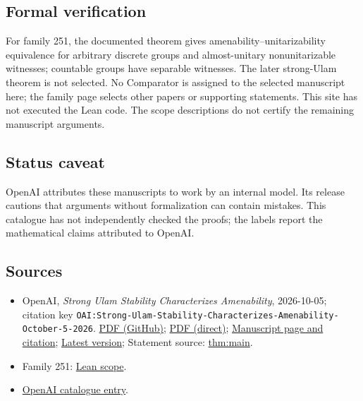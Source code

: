 \documentclass[11pt]{article}
\begin{document}
\subsection{Formal verification}
For family 251, the documented theorem gives amenability--unitarizability equivalence for arbitrary discrete groups and almost-unitary nonunitarizable witnesses; countable groups have separable witnesses. The later strong-Ulam theorem is not selected. No Comparator is assigned to the selected manuscript here; the family page selects other papers or supporting statements. This site has not executed the Lean code. The scope descriptions do not certify the remaining manuscript arguments.

\subsection{Status caveat}
OpenAI attributes these manuscripts to work by an internal model. Its release cautions that arguments without formalization can contain mistakes. This catalogue has not independently checked the proofs; the labels report the mathematical claims attributed to OpenAI.

\subsection{Sources}
\begin{itemize}
\item OpenAI, \emph{Strong Ulam Stability Characterizes Amenability}, 2026-10-05; citation key \texttt{OAI:Strong-Ulam-Stability-Characterizes-Amenability-October-5-2026}. \href{https://github.com/openai/math/blob/adc7f1241b42e322a6451854ab7e4b4c146bf78a/preprints/Strong-Ulam-Stability-Characterizes-Amenability-October-5-2026/strong-ulam-stability.pdf}{PDF (GitHub)}; \href{https://github.com/openai/math/raw/adc7f1241b42e322a6451854ab7e4b4c146bf78a/preprints/Strong-Ulam-Stability-Characterizes-Amenability-October-5-2026/strong-ulam-stability.pdf}{PDF (direct)}; \href{https://github.com/openai/math/blob/adc7f1241b42e322a6451854ab7e4b4c146bf78a/preprints/Strong-Ulam-Stability-Characterizes-Amenability-October-5-2026/README.md}{Manuscript page and citation}; \href{https://github.com/openai/math/blob/main/preprints/Strong-Ulam-Stability-Characterizes-Amenability-October-5-2026/strong-ulam-stability.pdf}{Latest version}; Statement source: \href{https://github.com/openai/math/blob/adc7f1241b42e322a6451854ab7e4b4c146bf78a/preprints/Strong-Ulam-Stability-Characterizes-Amenability-October-5-2026/build/strong-ulam-stability.tex\#L67}{thm:main}.
\item Family 251: \href{https://github.com/openai/math/blob/adc7f1241b42e322a6451854ab7e4b4c146bf78a/lean/docs/251.md}{Lean scope}.
\item \href{https://github.com/openai/math/blob/adc7f1241b42e322a6451854ab7e4b4c146bf78a/CONTENTS.md}{OpenAI catalogue entry}.
\end{itemize}
\end{document}
